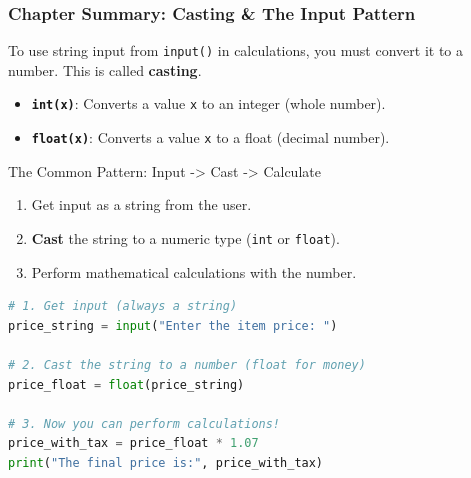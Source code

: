 \documentclass{beamer}
\begin{document}
\begin{frame}[fragile]
    \frametitle{Chapter Summary: Casting \& The Input Pattern}
    To use string input from \texttt{input()} in calculations, you must convert it to a number. This is called \textbf{casting}.

    \begin{itemize}
        \item \textbf{\texttt{int(x)}}: Converts a value \texttt{x} to an integer (whole number).
        \item \textbf{\texttt{float(x)}}: Converts a value \texttt{x} to a float (decimal number).
    \end{itemize}
    
    \vspace{1em}
    
    \begin{block}{The Common Pattern: Input -> Cast -> Calculate}
        \begin{enumerate}
            \item Get input as a string from the user.
            \item \textbf{Cast} the string to a numeric type (\texttt{int} or \texttt{float}).
            \item Perform mathematical calculations with the number.
        \end{enumerate}
    \end{block}

    \begin{lstlisting}[language=Python]
# 1. Get input (always a string)
price_string = input("Enter the item price: ")

# 2. Cast the string to a number (float for money)
price_float = float(price_string)

# 3. Now you can perform calculations!
price_with_tax = price_float * 1.07
print("The final price is:", price_with_tax)
    \end{lstlisting}
\end{frame}
\end{document}
